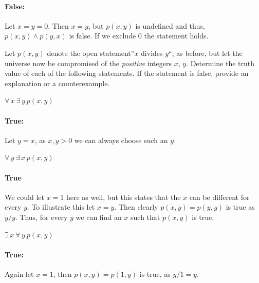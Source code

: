 \documentclass[a4paper, english, 12pt]{article} %
\begin{document}
\begin{answer}
  \paragraph{False:} Let $x = y = 0$. Then $x = y$, but $p(x,y)$ is undefined
  and thus, $p(x,y) \wedge p(y,x)$ is false. If we exclude $0$ the statement holds.
\end{answer}
\begin{subproblem}[3]
  Let $p(x,y)$ denote the open statement''$x$ divides $y$``, as before, but let
  the universe now be compromised of the \emph{positive} integers $x$, $y$.
  Determine the truth value of each of the following statements. If the
  statement is false, provide an explanation or a counterexample.
\end{subproblem}
% 
\begin{subsubproblem}
  $\forall \,x \ \exists\, y \ p(x, y)$
\end{subsubproblem}

\begin{answer}
  \paragraph{True:} Let $y = x$, as $x, y > 0$ we can always choose such an $y$.
\end{answer}
    
\begin{subsubproblem}
  $\forall \,y \ \exists\, x \ p(x, y)$
\end{subsubproblem}
\begin{answer}
  \paragraph{True} We could let $x = 1$ here as well, but this states that the
  $x$ can be different for every $y$. To illustrate this let $x = y$. Then
  clearly $p(x,y)=p(y,y)$ is true as $y/y$. Thus, for every $y$ we can find an
  $x$ such that $p(x,y)$ is true.
\end{answer}

\begin{subsubproblem}
  $\exists \,x \ \forall \, y \ p(x, y)$
\end{subsubproblem}
\begin{answer}
  \paragraph{True:} Again let $x = 1$, then $p(x,y)=p(1,y)$ is true, as $y/1 =
  y$. 
\end{answer}
\end{document}
